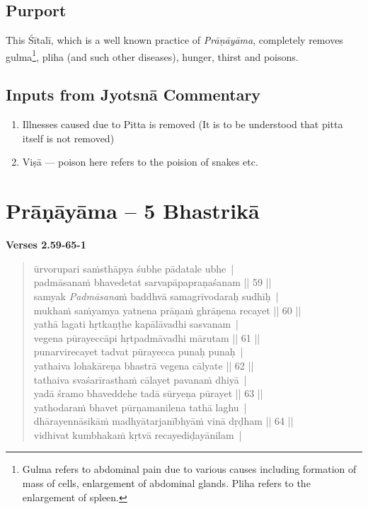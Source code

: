 \subsection*{Purport}


This Śītalī, which is a well known practice of \textit{Prāṇāyāma}, completely removes gulma\footnote{Gulma refers to abdominal pain due to various causes including formation of mass of cells, enlargement of abdominal glands. Pliha refers to the enlargement of spleen.}, pliha (and such other diseases), hunger, thirst and poisons.

\subsection*{Inputs from Jyotsnā Commentary}


\begin{enumerate}
\item Illnesses caused due to Pitta is removed (It is to be understood that pitta itself is not removed)
\item Viṣā --- poison here refers to the poision of snakes etc.
\end{enumerate}

\section*{Prāṇāyāma – 5 Bhastrikā}

\noindent \textbf{Verses 2.59-65-1}

\begin{verse}
ūrvorupari saṁsthāpya śubhe pādatale ubhe |\\
padmāsanaṁ bhavedetat sarvapāpapraṇaśanam || 59 ||\\
samyak \textit{Padmāsana}ṁ baddhvā samagrīvodaraḥ sudhīḥ |\\ 
mukhaṁ saṁyamya yatnena prāṇaṁ ghrāṇena recayet || 60 ||\\
yathā lagati hṛtkaṇṭhe kapālāvadhi sasvanam |\\
vegena pūrayeccāpi hṛtpadmāvadhi mārutam || 61 ||\\
punarvirecayet tadvat pūrayecca punaḥ punaḥ |\\
yathaiva lohakāreṇa bhastrā vegena cālyate || 62 ||\\
tathaiva svaśarīrasthaṁ cālayet pavanaṁ dhiyā |\\
yadā śramo bhaveddehe tadā sūryeṇa pūrayet || 63 ||\\
yathodaraṁ bhavet pūrṇamanilena tathā laghu |\\
dhārayennāsikāṁ madhyātarjanībhyāṁ vinā dṛḍham || 64 ||\\
vidhivat kumbhakaṁ kṛtvā recayediḍayānilam |
\end{verse}

